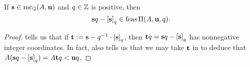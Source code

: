 \documentclass[11pt]{amsart}
\begin{document}
%
%
%





\begin{theorem}
\label{canonical-feasible: T}
If $\mathbf{s} \in \operatorname{mc}_{\mathbb{Q}}(A, \mathbf{u})$ and $q \in \mathbb{Z}$ is positive, then  \[ \mathbf{s}q - \left[ \mathbf{s} \right]_q \in \operatorname{feas} \Pi(A, \mathbf{u}, q).\] 
\end{theorem}

\begin{proof}   tells us that if $\mathbf{t} := \mathbf{s} - q^{-1} \cdot {\left[ \mathbf{s} \right]_q}$, then $\mathbf{t}q = \mathbf{s}q -\left[ \mathbf{s} \right]_q$ has nonnegative integer coordinates.  In fact,  also tells us that we may take $\mathbf{t}$ in  to deduce that $A (\mathbf{s} q - \left[ \mathbf{s} \right]_q ) =  A\mathbf{t}q <  \mathbf{u}q$.  
\end{proof}



\end{document}
